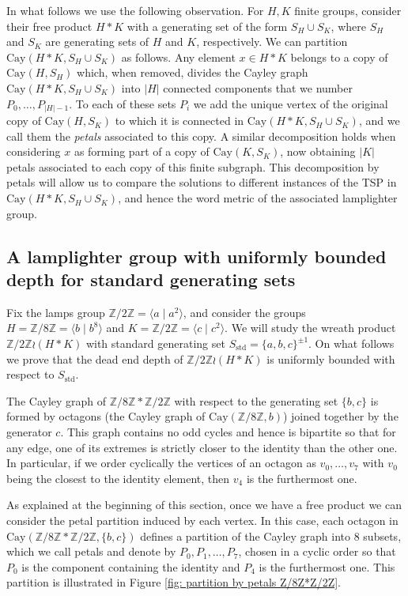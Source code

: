 \documentclass[reqno,oneside]{amsart}
\newcommand{\cay}[2]{\mathrm{Cay}(#1,#2)}
\newcommand{\Z}{\mathbb{Z}}
\newcommand{\std}{S_{\mathrm{std}}}
\theoremstyle{plain}
\theoremstyle{definition}
\begin{document}
In what follows we use the following observation. For $H,K$ finite groups, consider their free product $H*K$ with a generating set of the form $S_H\cup S_K$, where $S_H$ and $S_K$ are generating sets of $H$ and $K$, respectively. We can partition $\cay{H*K}{S_H\cup S_K}$ as follows. Any element $x\in H*K$ belongs to a copy of $\cay{H}{S_H}$ which, when removed, divides the Cayley graph $\cay{H*K}{S_H\cup S_K}$ into $|H|$ connected components that we number $P_0,\ldots, P_{|H|-1}$. To each of these sets $P_i$ we add the unique vertex of the original copy of $\cay{H}{S_K}$ to which it is connected in $\cay{H*K}{S_H\cup S_K}$, and we call them the \textit{petals} associated to this copy. A similar decomposition holds when considering $x$ as forming part of a copy of $\cay{K}{S_K}$, now obtaining $|K|$ petals associated to each copy of this finite subgraph. This decomposition by petals will allow us to compare the solutions to different instances of the TSP in $\cay{H*K}{S_H\cup S_K}$, and hence the word metric of the associated lamplighter group.


\subsection{A lamplighter group with uniformly bounded depth for standard generating sets}\label{subsection: lamplighter with uniformly bounded depth}



Fix the lamps group $\Z/2\Z=\langle a\mid a^2\rangle$, and consider the groups $H=\Z/8\Z=\langle b\mid b^8\rangle $ and $K=\Z/2\Z=\langle c\mid c^2\rangle$. We will study the wreath product $\Z/2\Z\wr (H* K)$ with standard generating set $\std=\{a, b,c\}^{\pm 1}$. On what follows we prove that the dead end depth of $\Z/2\Z\wr (H*K)$ is uniformly bounded with respect to $\std$.

The Cayley graph of $\Z/8\Z*\Z/2\Z$ with respect to the generating set $\{b,c\}$ is formed by octagons (the Cayley graph of $\cay{\Z/8\Z}{b}$) joined together by the generator $c$. This graph contains no odd cycles and hence is bipartite so that for any edge, one of its extremes is strictly closer to the identity than the other one. In particular, if we order cyclically the vertices of an octagon as $v_0,\ldots,v_7$ with $v_0$ being the closest to the identity element, then $v_4$ is the furthermost one.


As explained at the beginning of this section, once we have a free product we can consider the petal partition induced by each vertex. In this case, each octagon in $\cay{\Z/8\Z*\Z/2\Z}{ \{b,c\}}$ defines a partition of the Cayley graph into $8$ subsets, which we call petals and denote by $P_0,P_1,\ldots,P_7$, chosen in a cyclic order so that $P_0$ is the component containing the identity and $P_4$ is the furthermost one. This partition is illustrated in Figure \ref{fig: partition by petals Z/8Z*Z/2Z}.
\end{document}
